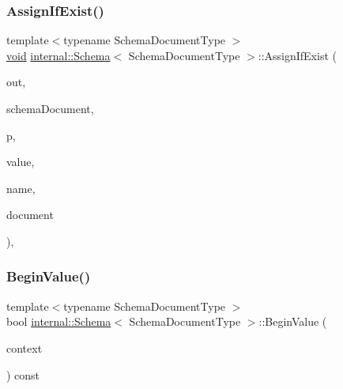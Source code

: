 \mbox{\label{classinternal_1_1Schema_aee68581c6e47937e50766af1e7ed29be}} 
\subsubsection{\texorpdfstring{Assign\+If\+Exist()}{AssignIfExist()}\hspace{0.1cm}{\footnotesize\ttfamily [3/3]}}
{\footnotesize\ttfamily template$<$typename Schema\+Document\+Type $>$ \\
\hyperlink{imgui__impl__opengl3__loader_8h_ac668e7cffd9e2e9cfee428b9b2f34fa7}{void} \hyperlink{classinternal_1_1Schema}{internal\+::\+Schema}$<$ Schema\+Document\+Type $>$\+::Assign\+If\+Exist (\begin{DoxyParamCaption}\item[{\hyperlink{structinternal_1_1Schema_1_1SchemaArray}{Schema\+Array} \&}]{out,  }\item[{Schema\+Document\+Type \&}]{schema\+Document,  }\item[{const \hyperlink{classinternal_1_1Schema_a13d7dbba6e4a77b10862546777c5aae8}{Pointer\+Type} \&}]{p,  }\item[{const \hyperlink{classinternal_1_1Schema_a8976b6d7e2a885483d0b51d941019340}{Value\+Type} \&}]{value,  }\item[{const \hyperlink{classinternal_1_1Schema_a8976b6d7e2a885483d0b51d941019340}{Value\+Type} \&}]{name,  }\item[{const \hyperlink{classinternal_1_1Schema_a8976b6d7e2a885483d0b51d941019340}{Value\+Type} \&}]{document }\end{DoxyParamCaption})\hspace{0.3cm}{\ttfamily [inline]}, {\ttfamily [private]}}

\mbox{\label{classinternal_1_1Schema_ae978defa6c4210365bdb3571643a0d40}} 
\subsubsection{\texorpdfstring{Begin\+Value()}{BeginValue()}}
{\footnotesize\ttfamily template$<$typename Schema\+Document\+Type $>$ \\
bool \hyperlink{classinternal_1_1Schema}{internal\+::\+Schema}$<$ Schema\+Document\+Type $>$\+::Begin\+Value (\begin{DoxyParamCaption}\item[{\hyperlink{classinternal_1_1Schema_ac3f54abfefe300c5610c1205869cfd66}{Context} \&}]{context }\end{DoxyParamCaption}) const\hspace{0.3cm}{\ttfamily [inline]}}

